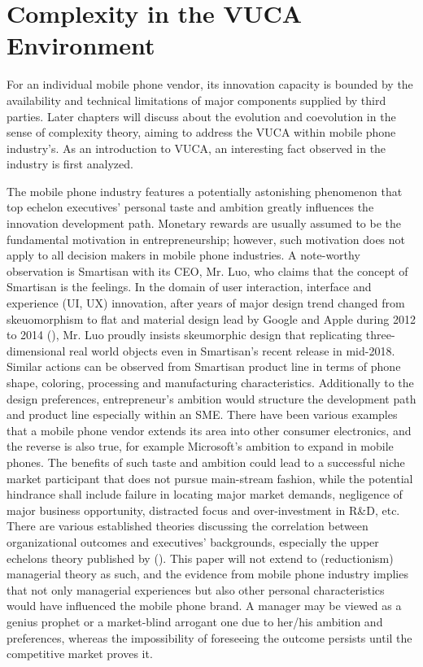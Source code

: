 \documentclass[utf8,english]{gradu3}
\begin{document}
\section{Complexity in the VUCA Environment}

For an individual mobile phone vendor, its innovation capacity is bounded by the availability and technical limitations of major components supplied by third parties. Later chapters will discuss about the evolution and coevolution in the sense of complexity theory, aiming to address the VUCA within mobile phone industry's. As an introduction to VUCA, an interesting fact observed in the industry is first analyzed.

The mobile phone industry features a potentially astonishing phenomenon that top echelon executives' personal taste and ambition greatly influences the innovation development path. Monetary rewards are usually assumed to be the fundamental motivation in entrepreneurship; however, such motivation does not apply to all decision makers in mobile phone industries. A note-worthy observation is Smartisan with its CEO, Mr. Luo, who claims that the concept of Smartisan is the feelings. In the domain of user interaction, interface and experience (UI, UX) innovation, after years of major design trend changed from skeuomorphism to flat and material design lead by Google and Apple during 2012 to 2014 (\cite{burmistrov2015flat}), Mr. Luo proudly insists skeumorphic design that replicating three-dimensional real world objects even in Smartisan's recent release in mid-2018. Similar actions can be observed from Smartisan product line in terms of phone shape, coloring, processing and manufacturing characteristics. Additionally to the design preferences, entrepreneur's ambition would structure the development path and product line especially within an SME. There have been various examples that a mobile phone vendor extends its area into other consumer electronics, and the reverse is also true, for example Microsoft's ambition to expand in mobile phones. The benefits of such taste and ambition could lead to a successful niche market participant that does not pursue main-stream fashion, while the potential hindrance shall include failure in locating major market demands, negligence of major business opportunity, distracted focus and over-investment in R\&D, etc. There are various established theories discussing the correlation between organizational outcomes and executives' backgrounds, especially the upper echelons theory published by \citeauthor{hambrick1984upper} (\citeyear{hambrick1984upper}). This paper will not extend to (reductionism) managerial theory as such, and the evidence from mobile phone industry implies that not only managerial experiences but also other personal characteristics would have influenced the mobile phone brand. A manager may be viewed as a genius prophet or a market-blind arrogant one due to her/his ambition and preferences, whereas the impossibility of foreseeing the outcome persists until the competitive market proves it.
\end{document}
